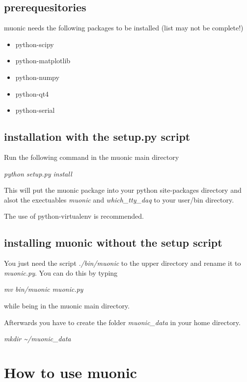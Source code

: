 \documentclass[letterpaper,10pt,english]{sphinxmanual}
\begin{document}
\subsection{prerequesitories}
\label{setup:prerequesitories}
muonic needs the following packages to be installed (list may not be complete!)
\begin{itemize}
\item {} 
python-scipy

\item {} 
python-matplotlib

\item {} 
python-numpy

\item {} 
python-qt4

\item {} 
python-serial

\end{itemize}


\subsection{installation with the setup.py script}
\label{setup:installation-with-the-setup-py-script}
Run the following command in the muonic main directory

\emph{python setup.py install}

This will put the muonic package into your python site-packages directory and alsot the exectuables \emph{muonic} and \emph{which\_tty\_daq} to your user/bin directory.

The use of python-virtualenv is recommended.


\subsection{installing muonic without the setup script}
\label{setup:installing-muonic-without-the-setup-script}
You just need the script \emph{./bin/muonic} to the upper directory and rename it to \emph{muonic.py}.
You can do this by typing

\emph{mv bin/muonic muonic.py}

while being in the muonic main directory.

Afterwards you have to create the folder \emph{muonic\_data} in your home directory.

\emph{mkdir \textasciitilde{}/muonic\_data}


\section{How to use muonic}
\label{tutorial::doc}\label{tutorial:how-to-use-muonic}
\end{document}

